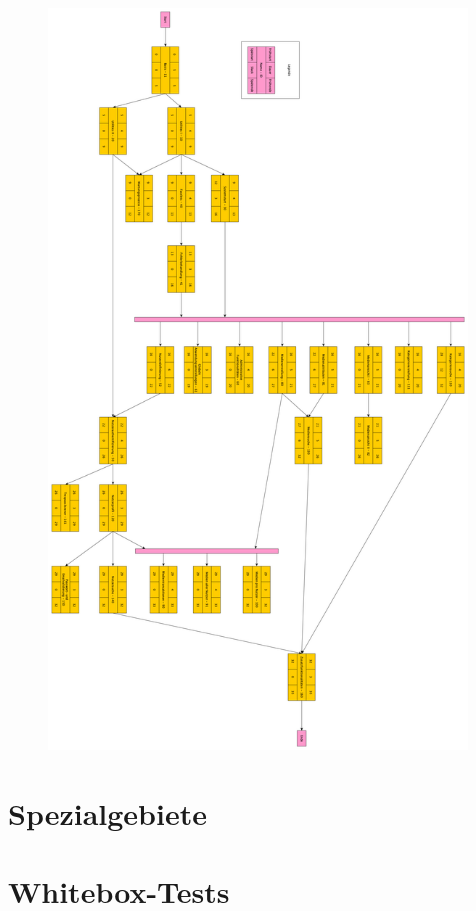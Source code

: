 \documentclass{article}
\begin{document}
\begin{figure}[H]
	\centering
	\includegraphics[width = 30em]{PERT}
\end{figure}


\section{Spezialgebiete}


\section{Whitebox-Tests}
\end{document}

